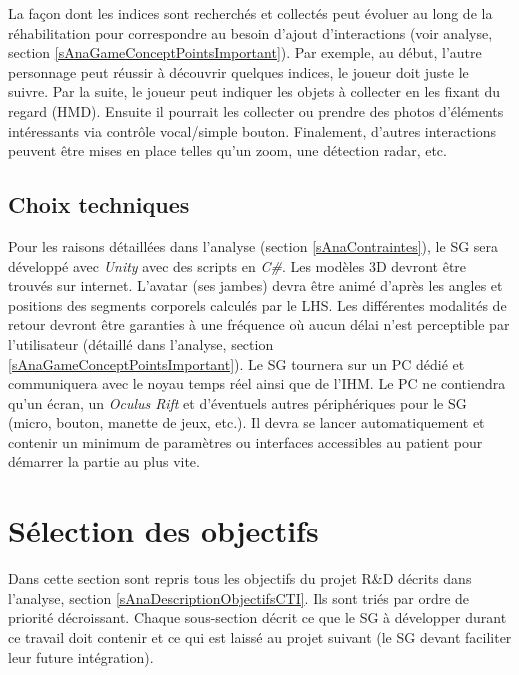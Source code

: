 		La façon dont les indices sont recherchés et collectés peut évoluer au long de la réhabilitation pour correspondre au besoin d'ajout d'interactions (voir analyse, section \ref{sAnaGameConceptPointsImportant}). Par exemple, au début, l'autre personnage peut réussir à découvrir quelques indices, le joueur doit juste le suivre. Par la suite, le joueur peut indiquer les objets à collecter en les fixant du regard (HMD). Ensuite il pourrait les collecter ou prendre des photos d'éléments intéressants via contrôle vocal/simple bouton. Finalement, d'autres interactions peuvent être mises en place telles qu'un zoom, une détection radar, etc.
		
	\subsection*{Choix techniques}
		Pour les raisons détaillées dans l'analyse (section \ref{sAnaContraintes}), le SG sera développé avec \textit{Unity} avec des scripts en \textit{C\#}. Les modèles 3D devront être trouvés sur internet. %
		L'avatar (ses jambes) devra être animé d'après les angles et positions des segments corporels calculés par le LHS. Les différentes modalités de retour devront être garanties à une fréquence où aucun délai n'est perceptible par l'utilisateur (détaillé dans l'analyse, section \ref{sAnaGameConceptPointsImportant}).
		Le SG tournera sur un PC dédié et communiquera avec le noyau temps réel ainsi que de l'IHM. Le PC ne contiendra qu'un écran, un \textit{Oculus Rift} et d'éventuels autres périphériques pour le SG (micro, bouton, manette de jeux, etc.). Il devra se lancer automatiquement et contenir un minimum de paramètres ou interfaces accessibles au patient pour démarrer la partie au plus vite.
		

\section{Sélection des objectifs}
\label{sConSelectionObjectifs}
	Dans cette section sont repris tous les objectifs du projet R\&D décrits dans l'analyse, section \ref{sAnaDescriptionObjectifsCTI}. Ils sont triés par ordre de priorité décroissant. Chaque sous-section décrit ce que le SG à développer durant ce travail doit contenir et ce qui est laissé au projet suivant (le SG devant faciliter leur future intégration).
